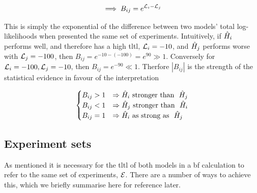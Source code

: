 \begin{equation}
    \label{eqn:bf_succinct}
    \implies B_{ij} = e^{{\mathcal{L}}_{i} - {\mathcal{L}}_{j}}    
\end{equation}


This is simply the exponential of the difference between two models' total log-likelihoods when presented the same set of experiments. 
Intuitively, if $\hat{H}_i$ performs well, and therefore has a high \gls{tltl}, ${\mathcal{L}}_{i}=-10$, 
    and $\hat{H}_j$ performs worse with ${\mathcal{L}}_{j}=-100$, then $B_{ij} = e^{-10-(-100)} = e^{90} \gg 1$.
Conversely for ${\mathcal{L}}_{i}=-100, {\mathcal{L}}_{j}=-10$, then $B_{ij} = e^{-90} \ll 1$. 
Therfore $\left| B_{ij} \right|$ is the strength of the statistical evidence
    in favour of the interpretation 

\begin{equation}
    \label{eqn:bf_cases}
    \begin{cases}
        B_{ij} > 1 & \Rightarrow \hat{H}_i \text{\ stronger than \ } \hat{H}_j \\
        B_{ij} < 1 & \Rightarrow \hat{H}_j \text{\ stronger than \ } \hat{H}_i \\
        B_{ij} = 1 & \Rightarrow \hat{H}_i \text{\ as strong as \ } \hat{H}_j \\
    \end{cases}
\end{equation} 

\subsection{Experiment sets}\label{sec:experiments_for_bf}
As mentioned it is necessary for the \gls{tltl} of both models in a \gls{bf} calculation to
    refer to the same set of experiments, ${ \mathcal{E} }$. 
There are a number of ways to achieve this, 
    which we briefly summarise here for reference later. 
\par 

